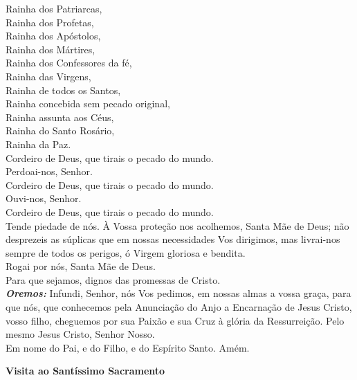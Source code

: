 \documentclass{book}
\begin{document}
\begin{flushleft}
    \VbarRed{} Rainha dos Patriarcas, \\
    \VbarRed{} Rainha dos Profetas, \\
    \VbarRed{} Rainha dos Apóstolos, \\
    \VbarRed{} Rainha dos Mártires, \\
    \VbarRed{} Rainha dos Confessores da fé, \\
    \VbarRed{} Rainha das Virgens, \\
    \VbarRed{} Rainha de todos os Santos, \\
    \VbarRed{} Rainha concebida sem pecado original, \\
    \VbarRed{} Rainha assunta aos Céus, \\
    \VbarRed{} Rainha do Santo Rosário, \\
    \VbarRed{} Rainha da Paz.
    \vspace{.2cm} \\
    \VbarRed{} Cordeiro de Deus, que tirais o pecado do mundo. \\
    \RbarRed{} Perdoai-nos, Senhor. \\
    \VbarRed{} Cordeiro de Deus, que tirais o pecado do mundo. \\
    \RbarRed{} Ouvi-nos, Senhor. \\
    \VbarRed{} Cordeiro de Deus, que tirais o pecado do mundo. \\
    \RbarRed{} Tende piedade de nós.
    \newpage
    À Vossa proteção nos acolhemos, Santa Mãe de Deus; não desprezeis as súplicas que em nossas necessidades Vos dirigimos, mas livrai-nos sempre de todos os perigos, ó Virgem gloriosa e bendita.
    \vspace{.2cm} \\
    \VbarRed{} Rogai por nós, Santa Mãe de Deus. \\
    \RbarRed{} Para que sejamos, dignos das promessas de Cristo.
    \vspace{.2cm} \\
    \textbf{\textit{Oremos:}} Infundi, Senhor, nós Vos pedimos, em nossas almas a vossa graça, para que nós, que conhecemos pela Anunciação do Anjo a Encarnação de Jesus Cristo, vosso filho, cheguemos por sua Paixão e sua Cruz à glória da Ressurreição. Pelo mesmo Jesus Cristo, Senhor Nosso.
    \vspace{.2cm} \\
    Em nome do Pai, \grecrossRed{} e do Filho, e do Espírito Santo. Amém.
\end{flushleft}
\newpage
\begin{center}
    \textbf{Visita ao Santíssimo Sacramento}
\end{center}
\end{document}
